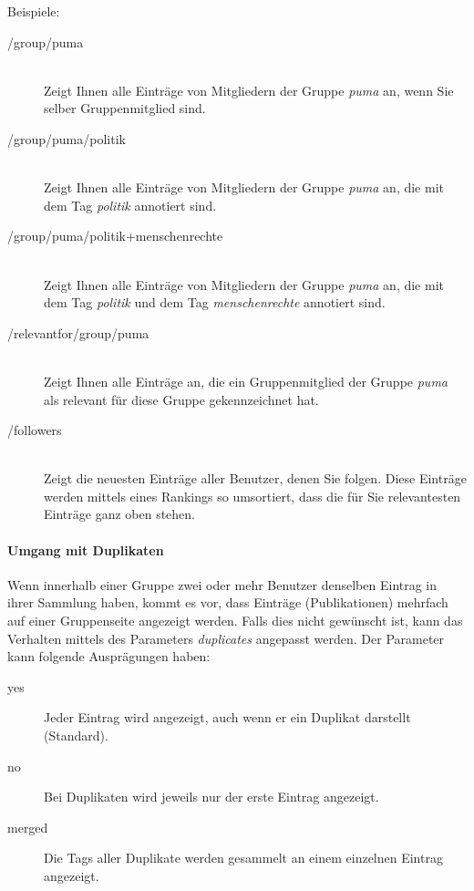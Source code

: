 Beispiele:
\begin{description}
    \item [/group/puma] \hfill \\
    Zeigt Ihnen alle Einträge von Mitgliedern der Gruppe \textit{puma} an, wenn Sie selber Gruppenmitglied sind.
    \item [/group/puma/politik] \hfill \\
    Zeigt Ihnen alle Einträge von Mitgliedern der Gruppe \textit{puma} an, die mit dem Tag \textit{politik} annotiert sind. 
    \item [/group/puma/politik+menschenrechte] \hfill \\
    Zeigt Ihnen alle Einträge von Mitgliedern der Gruppe \textit{puma} an, die mit dem Tag \textit{politik} und dem Tag \textit{menschenrechte} annotiert sind. 
    \item [/relevantfor/group/puma] \hfill \\
    Zeigt Ihnen alle Einträge an, die ein Gruppenmitglied der Gruppe \textit{puma} als relevant für diese Gruppe gekennzeichnet hat.
    \item [/followers] \hfill \\
    Zeigt die neuesten Einträge aller Benutzer, denen Sie folgen. Diese Einträge werden mittels eines Rankings so umsortiert, dass die für Sie relevantesten Einträge ganz oben stehen. 
\end{description}



\paragraph*{Umgang mit Duplikaten}
\label{subsec:duplikate}
Wenn innerhalb einer Gruppe zwei oder mehr Benutzer denselben Eintrag in ihrer Sammlung haben, kommt es vor, dass Einträge (Publikationen) mehrfach auf einer Gruppenseite angezeigt werden. Falls dies nicht gewünscht ist, kann das Verhalten mittels des Parameters \textit{duplicates} angepasst werden. Der Parameter kann folgende Ausprägungen haben:
\begin{description}
\item [yes] Jeder Eintrag wird angezeigt, auch wenn er ein Duplikat darstellt (Standard).
  \item[no] Bei Duplikaten wird jeweils nur der erste Eintrag angezeigt.
  \item [merged] Die Tags aller Duplikate werden gesammelt an einem einzelnen Eintrag angezeigt.
  \end{description}

